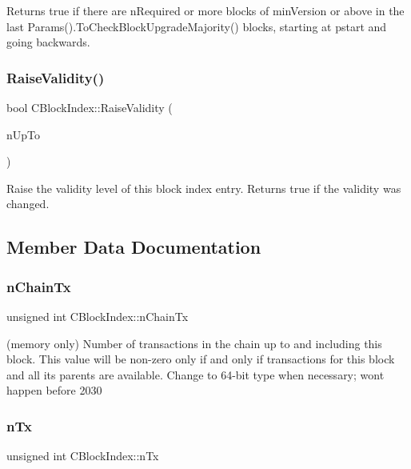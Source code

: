 Returns true if there are n\+Required or more blocks of min\+Version or above in the last Params().To\+Check\+Block\+Upgrade\+Majority() blocks, starting at pstart and going backwards. \mbox{\label{class_c_block_index_a076aff906933e9d75a37aa9b81c01384}} 
\subsubsection{\texorpdfstring{Raise\+Validity()}{RaiseValidity()}}
{\footnotesize\ttfamily bool C\+Block\+Index\+::\+Raise\+Validity (\begin{DoxyParamCaption}\item[{enum Block\+Status}]{n\+Up\+To }\end{DoxyParamCaption})\hspace{0.3cm}{\ttfamily [inline]}}

Raise the validity level of this block index entry. Returns true if the validity was changed. 

\subsection{Member Data Documentation}
\mbox{\label{class_c_block_index_af3c6d6dd8a7579e5ce516d94b98d2db5}} 
\subsubsection{\texorpdfstring{n\+Chain\+Tx}{nChainTx}}
{\footnotesize\ttfamily unsigned int C\+Block\+Index\+::n\+Chain\+Tx}

(memory only) Number of transactions in the chain up to and including this block. This value will be non-\/zero only if and only if transactions for this block and all its parents are available. Change to 64-\/bit type when necessary; won\textquotesingle{}t happen before 2030 \mbox{\label{class_c_block_index_ac8e219a377839d2f9133a4387f46e44e}} 
\subsubsection{\texorpdfstring{n\+Tx}{nTx}}
{\footnotesize\ttfamily unsigned int C\+Block\+Index\+::n\+Tx}

